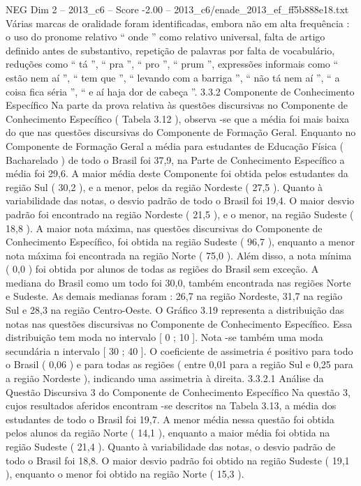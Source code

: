\begin{textsample}{NEG Dim 2 – 2013\_c6 – Score -2.00 – 2013\_c6/enade\_2013\_ef\_ff5b888e18.txt}
Várias marcas de oralidade foram identificadas, embora não em alta frequência : o uso do pronome relativo “ onde ” como relativo universal, falta de artigo definido antes de substantivo, repetição de palavras por falta de vocabulário, reduções como “ tá ”, “ pra ”, “ pro ”, “ prum ”, expressões informais como “ estão nem aí ”, “ tem que ”, “ levando com a barriga ”, “ não tá nem aí ”, “ a coisa fica séria ”, “ e aí haja dor de cabeça ”. 3.3.2 Componente de Conhecimento Específico Na parte da prova relativa às questões discursivas no Componente de Conhecimento Específico ( Tabela 3.12 ), observa -se que a média foi mais baixa do que nas questões discursivas do Componente de Formação Geral.
Enquanto no Componente de Formação Geral a média para estudantes de Educação Física ( Bacharelado ) de todo o Brasil foi 37,9, na Parte de Conhecimento Específico a média foi 29,6.
A maior média deste Componente foi obtida pelos estudantes da região Sul ( 30,2 ), e a menor, pelos da região Nordeste ( 27,5 ).
Quanto à variabilidade das notas, o desvio padrão de todo o Brasil foi 19,4.
O maior desvio padrão foi encontrado na região Nordeste ( 21,5 ), e o menor, na região Sudeste ( 18,8 ).
A maior nota máxima, nas questões discursivas do Componente de Conhecimento Específico, foi obtida na região Sudeste ( 96,7 ), enquanto a menor nota máxima foi encontrada na região Norte ( 75,0 ).
Além disso, a nota mínima ( 0,0 ) foi obtida por alunos de todas as regiões do Brasil sem exceção.
A mediana do Brasil como um todo foi 30,0, também encontrada nas regiões Norte e Sudeste.
As demais medianas foram : 26,7 na região Nordeste, 31,7 na região Sul e 28,3 na região Centro-Oeste.
O Gráfico 3.19 representa a distribuição das notas nas questões discursivas no Componente de Conhecimento Específico.
Essa distribuição tem moda no intervalo [ 0 ; 10 ].
Nota -se também uma moda secundária n intervalo [ 30 ; 40 ].
O coeficiente de assimetria é positivo para todo o Brasil ( 0,06 ) e para todas as regiões ( entre 0,01 para a região Sul e 0,25 para a região Nordeste ), indicando uma assimetria à direita. 3.3.2.1 Análise da Questão Discursiva 3 do Componente de Conhecimento Específico Na questão 3, cujos resultados aferidos encontram -se descritos na Tabela 3.13, a média dos estudantes de todo o Brasil foi 19,7.
A menor média nessa questão foi obtida pelos alunos da região Norte ( 14,1 ), enquanto a maior média foi obtida na região Sudeste ( 21,4 ).
Quanto à variabilidade das notas, o desvio padrão de todo o Brasil foi 18,8.
O maior desvio padrão foi obtido na região Sudeste ( 19,1 ), enquanto o menor foi obtido na região Norte ( 15,3 ).

\end{textsample}
